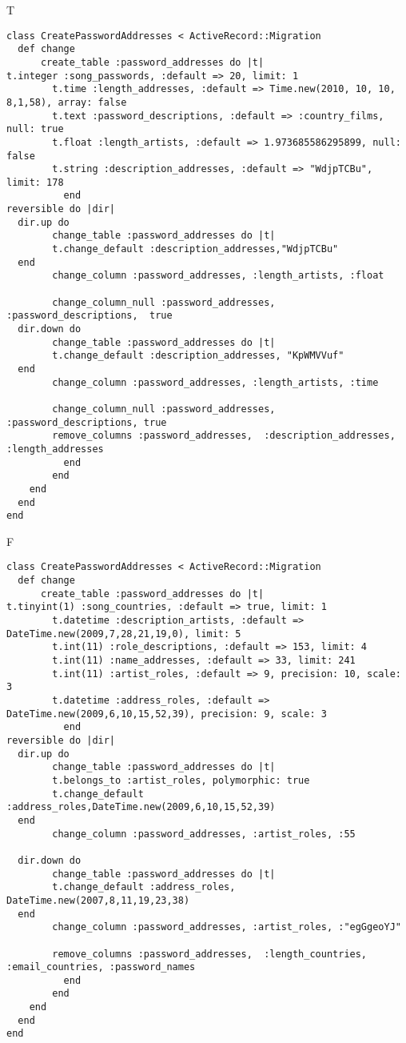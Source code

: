 T
\begin{verbatim}
class CreatePasswordAddresses < ActiveRecord::Migration
  def change
	  create_table :password_addresses do |t|
t.integer :song_passwords, :default => 20, limit: 1
		t.time :length_addresses, :default => Time.new(2010, 10, 10, 8,1,58), array: false
		t.text :password_descriptions, :default => :country_films, null: true
		t.float :length_artists, :default => 1.973685586295899, null: false
		t.string :description_addresses, :default => "WdjpTCBu", limit: 178
		  end
reversible do |dir|
  dir.up do
		change_table :password_addresses do |t|
		t.change_default :description_addresses,"WdjpTCBu"
  end
 		change_column :password_addresses, :length_artists, :float
   
		change_column_null :password_addresses, :password_descriptions,  true
  dir.down do
		change_table :password_addresses do |t|
		t.change_default :description_addresses, "KpWMVVuf"
  end
 		change_column :password_addresses, :length_artists, :time
   
		change_column_null :password_addresses, :password_descriptions, true
 		remove_columns :password_addresses,  :description_addresses, :length_addresses 
	      end
	    end
    end 
  end
end

\end{verbatim}

F
\begin{verbatim}
class CreatePasswordAddresses < ActiveRecord::Migration
  def change
	  create_table :password_addresses do |t|
t.tinyint(1) :song_countries, :default => true, limit: 1
		t.datetime :description_artists, :default => DateTime.new(2009,7,28,21,19,0), limit: 5
		t.int(11) :role_descriptions, :default => 153, limit: 4
		t.int(11) :name_addresses, :default => 33, limit: 241
		t.int(11) :artist_roles, :default => 9, precision: 10, scale: 3
		t.datetime :address_roles, :default => DateTime.new(2009,6,10,15,52,39), precision: 9, scale: 3
		  end
reversible do |dir|
  dir.up do
		change_table :password_addresses do |t|
		t.belongs_to :artist_roles, polymorphic: true
 		t.change_default :address_roles,DateTime.new(2009,6,10,15,52,39)
  end
 		change_column :password_addresses, :artist_roles, :55
   
  dir.down do
		change_table :password_addresses do |t|
		t.change_default :address_roles, DateTime.new(2007,8,11,19,23,38)
  end
 		change_column :password_addresses, :artist_roles, :"egGgeoYJ"
   
		remove_columns :password_addresses,  :length_countries, :email_countries, :password_names 
	      end
	    end
    end 
  end
end

\end{verbatim}

